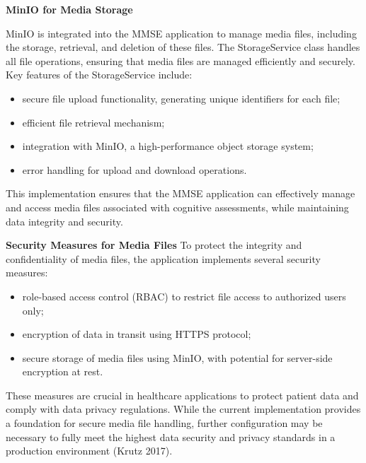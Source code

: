 \textbf{MinIO for Media Storage}

MinIO is integrated into the MMSE application to manage media files, including the storage, retrieval, and deletion of these files. The StorageService class handles all file operations, ensuring that media files are managed efficiently and securely.
Key features of the StorageService include:
\begin{itemize}
\item secure file upload functionality, generating unique identifiers for each file;
\item efficient file retrieval mechanism;
\item integration with MinIO, a high-performance object storage system;
\item error handling for upload and download operations.
\end{itemize}
This implementation ensures that the MMSE application can effectively manage and access media files associated with cognitive assessments, while maintaining data integrity and security.

\textbf{Security Measures for Media Files}
To protect the integrity and confidentiality of media files, the application implements several security measures:
\begin{itemize}
\item role-based access control (RBAC) to restrict file access to authorized users only;
\item encryption of data in transit using HTTPS protocol;
\item secure storage of media files using MinIO, with potential for server-side encryption at rest.
\end{itemize}
These measures are crucial in healthcare applications to protect patient data and comply with data privacy regulations. While the current implementation provides a foundation for secure media file handling, further configuration may be necessary to fully meet the highest data security and privacy standards in a production environment (Krutz 2017).